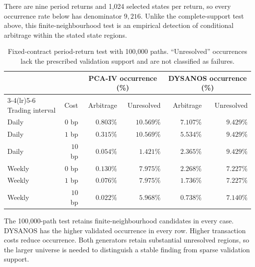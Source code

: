 There are nine period returns and 1,024
selected states per return, so every occurrence rate below has denominator
$9{,}216$. Unlike the complete-support test above, this finite-neighbourhood
test is an empirical detection of conditional arbitrage within the stated
state regions.

\begin{table}[H]
\centering
\small
\setlength{\tabcolsep}{4pt}
\begin{tabular}{lrrrrr}
\toprule
 & & \multicolumn{2}{c}{PCA-IV occurrence (\%)}
       & \multicolumn{2}{c}{DYSANOS occurrence (\%)}\\
\cmidrule(lr){3-4}\cmidrule(lr){5-6}
Trading interval & Cost & Arbitrage & Unresolved
                         & Arbitrage & Unresolved\\
\midrule
Daily  & $0$ bp  & $0.803\%$ & $10.569\%$ & $7.107\%$ & $9.429\%$\\
Daily  & $1$ bp  & $0.315\%$ & $10.569\%$ & $5.534\%$ & $9.429\%$\\
Daily  & $10$ bp & $0.054\%$ & $1.421\%$  & $2.365\%$ & $9.429\%$\\
Weekly & $0$ bp  & $0.130\%$ & $7.975\%$  & $2.268\%$ & $7.227\%$\\
Weekly & $1$ bp  & $0.076\%$ & $7.975\%$  & $1.736\%$ & $7.227\%$\\
Weekly & $10$ bp & $0.022\%$ & $5.968\%$  & $0.738\%$ & $7.140\%$\\
\bottomrule
\end{tabular}
\caption{Fixed-contract period-return test with 100,000 paths.
 ``Unresolved'' occurrences lack the prescribed validation support and are
not classified as failures.}
\label{tab:period_comparison_100k}
\end{table}

The 100,000-path test retains finite-neighbourhood candidates in every case.
DYSANOS has the higher validated occurrence in every row. Higher transaction
costs reduce occurrence. Both generators retain substantial unresolved
regions, so the larger universe is needed to distinguish a stable finding
from sparse validation support.

